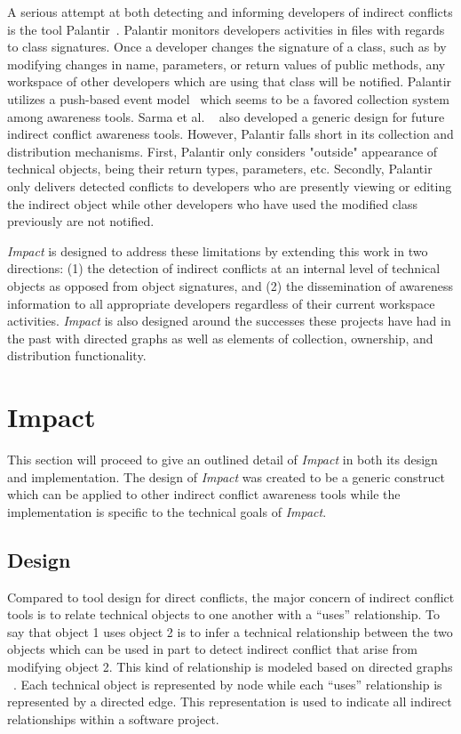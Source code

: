 \documentclass[conference]{IEEEtran}
\begin{document}
A serious attempt at both detecting and informing developers of
indirect conflicts is the tool Palantir~\cite{Sarma:2007:TSA}. Palantir
monitors developers activities in files with regards to class signatures.
Once a developer changes the signature of a class, such as by modifying changes
in name, parameters, or return values of public methods, any workspace
of other developers which are using that class will be notified. Palantir utilizes
a push-based event model~\cite{Fitzpatrick:2002:SPA} which seems to be
a favored collection system among awareness tools. Sarma et al.
~\cite{Sarma:2007:TSA} also
developed a generic design for future indirect conflict awareness tools. 
However, Palantir falls short in its collection and distribution
mechanisms. First, Palantir only considers "outside" appearance of technical
objects, being their return types, parameters, etc. Secondly, Palantir 
only delivers
detected conflicts to developers who are presently viewing or editing
the indirect object while other developers who have used the modified 
class previously are not notified.

\textit{Impact} is designed to address these limitations by extending this work in
two directions: (1) the detection of indirect conflicts at an internal level
of technical objects as opposed from object signatures, and (2) the dissemination of
awareness information to all appropriate developers regardless of their current
workspace activities. \textit{Impact} is also designed around the successes these
projects have had in the past with directed graphs as 
well as elements of collection, ownership, and distribution functionality.


\section{Impact}
This section will proceed to give an outlined detail of \textit{Impact} in both its
design and implementation. The design of \textit{Impact} was created to be
a generic construct which can be applied to other indirect conflict 
awareness tools while the implementation is specific to the technical
goals of \textit{Impact}.

\subsection{Design}
Compared to tool design for direct conflicts, the major concern of 
indirect conflict tools is to relate technical objects to one another
with a ``uses'' relationship. To say that object 1 uses object 2 is to infer
a technical relationship between the two objects which can be used
in part to detect indirect conflict that arise from modifying object
2. This kind of relationship is modeled based on directed graphs ~\cite{Horwitz:1992:UPD}. 
Each technical object is represented by node while each ``uses''
relationship is represented by a directed edge. This representation
is used to indicate all indirect relationships within a software project.
\end{document}
